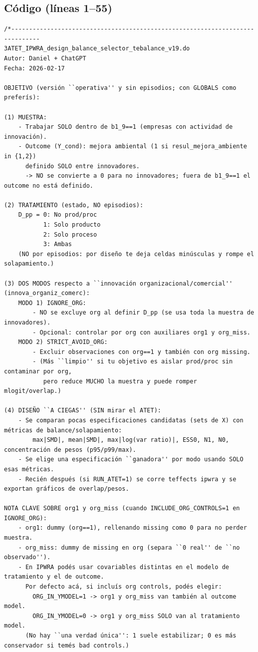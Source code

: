\documentclass[12pt]{article}
\begin{document}
\subsection*{Código (líneas 1--55)}
\begin{lstlisting}
/*------------------------------------------------------------------------------
3ATET_IPWRA_design_balance_selector_tebalance_v19.do
Autor: Daniel + ChatGPT
Fecha: 2026-02-17

OBJETIVO (versión ``operativa'' y sin episodios; con GLOBALS como preferís):

(1) MUESTRA:
    - Trabajar SOLO dentro de b1_9==1 (empresas con actividad de innovación).
    - Outcome (Y_cond): mejora ambiental (1 si resul_mejora_ambiente in {1,2})
      definido SOLO entre innovadores.
      -> NO se convierte a 0 para no innovadores; fuera de b1_9==1 el outcome no está definido.

(2) TRATAMIENTO (estado, NO episodios):
    D_pp = 0: No prod/proc
           1: Solo producto
           2: Solo proceso
           3: Ambas
    (NO por episodios: por diseño te deja celdas minúsculas y rompe el solapamiento.)

(3) DOS MODOS respecto a ``innovación organizacional/comercial'' (innova_organiz_comerc):
    MODO 1) IGNORE_ORG:
        - NO se excluye org al definir D_pp (se usa toda la muestra de innovadores).
        - Opcional: controlar por org con auxiliares org1 y org_miss.
    MODO 2) STRICT_AVOID_ORG:
        - Excluir observaciones con org==1 y también con org missing.
        - (Más ``limpio'' si tu objetivo es aislar prod/proc sin contaminar por org,
           pero reduce MUCHO la muestra y puede romper mlogit/overlap.)

(4) DISEÑO ``A CIEGAS'' (SIN mirar el ATET):
    - Se comparan pocas especificaciones candidatas (sets de X) con métricas de balance/solapamiento:
        max|SMD|, mean|SMD|, max|log(var ratio)|, ESS0, N1, N0, concentración de pesos (p95/p99/max).
    - Se elige una especificación ``ganadora'' por modo usando SOLO esas métricas.
    - Recién después (si RUN_ATET=1) se corre teffects ipwra y se exportan gráficos de overlap/pesos.

NOTA CLAVE SOBRE org1 y org_miss (cuando INCLUDE_ORG_CONTROLS=1 en IGNORE_ORG):
    - org1: dummy (org==1), rellenando missing como 0 para no perder muestra.
    - org_miss: dummy de missing en org (separa ``0 real'' de ``no observado'').
    - En IPWRA podés usar covariables distintas en el modelo de tratamiento y el de outcome.
      Por defecto acá, si incluís org controls, podés elegir:
        ORG_IN_YMODEL=1 -> org1 y org_miss van también al outcome model.
        ORG_IN_YMODEL=0 -> org1 y org_miss SOLO van al tratamiento model.
      (No hay ``una verdad única'': 1 suele estabilizar; 0 es más conservador si temés bad controls.)


\end{lstlisting}
\end{document}
